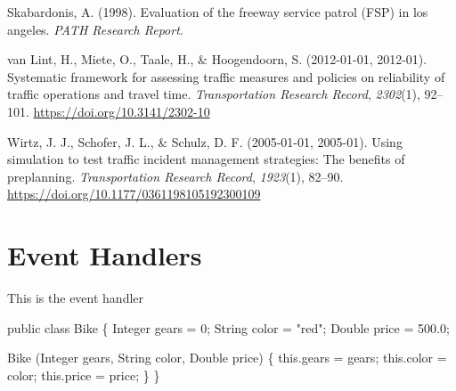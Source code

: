 \documentclass[fancy, oneside, mastersfancy, ms]{byuthesis}
\newenvironment{Shaded}{\begin{snugshade}}{\end{snugshade}}
\newcommand{\BuiltInTok}[1]{\textcolor[rgb]{0.00,0.23,0.31}{#1}}
\newcommand{\DecValTok}[1]{\textcolor[rgb]{0.68,0.00,0.00}{#1}}
\newcommand{\FloatTok}[1]{\textcolor[rgb]{0.68,0.00,0.00}{#1}}
\newcommand{\FunctionTok}[1]{\textcolor[rgb]{0.28,0.35,0.67}{#1}}
\newcommand{\KeywordTok}[1]{\textcolor[rgb]{0.00,0.23,0.31}{#1}}
\newcommand{\NormalTok}[1]{\textcolor[rgb]{0.00,0.23,0.31}{#1}}
\newcommand{\OperatorTok}[1]{\textcolor[rgb]{0.37,0.37,0.37}{#1}}
\newcommand{\StringTok}[1]{\textcolor[rgb]{0.13,0.47,0.30}{#1}}
\newlength{\cslhangindent}
\newlength{\cslentryspacingunit} %
\newenvironment{CSLReferences}[2] %
 {%
  \setlength{\parindent}{0pt}
  \ifodd #1
  \let\oldpar\par
  \def\par{\hangindent=\cslhangindent\oldpar}
  \fi
  \setlength{\parskip}{#2\cslentryspacingunit}
 }%
 {}
\begin{document}
\begin{CSLReferences}{1}{0}
\leavevmode{}%
Skabardonis, A. (1998). Evaluation of the freeway service patrol ({FSP})
in los angeles. \emph{PATH Research Report}.

\leavevmode{}%
van Lint, H., Miete, O., Taale, H., \& Hoogendoorn, S. (2012-01-01,
2012-01). Systematic framework for assessing traffic measures and
policies on reliability of traffic operations and travel time.
\emph{Transportation Research Record}, \emph{2302}(1), 92--101.
\url{https://doi.org/10.3141/2302-10}

\leavevmode{}%
Wirtz, J. J., Schofer, J. L., \& Schulz, D. F. (2005-01-01, 2005-01).
Using simulation to test traffic incident management strategies: {The}
benefits of preplanning. \emph{Transportation Research Record},
\emph{1923}(1), 82--90.
\url{https://doi.org/10.1177/0361198105192300109}

\end{CSLReferences}

\cleardoublepage
{}
{}
\appendix

\hypertarget{event-handlers}{%
\chapter{Event Handlers}\label{event-handlers}}

This is the event handler

\begin{Shaded}
\begin{Highlighting}[]
\KeywordTok{public} \KeywordTok{class}\NormalTok{ Bike }\OperatorTok{\{}
    \BuiltInTok{Integer}\NormalTok{ gears }\OperatorTok{=} \DecValTok{0}\OperatorTok{;}
    \BuiltInTok{String}\NormalTok{ color }\OperatorTok{=} \StringTok{"red"}\OperatorTok{;}
    \BuiltInTok{Double}\NormalTok{ price }\OperatorTok{=} \FloatTok{500.0}\OperatorTok{;}

    \FunctionTok{Bike} \OperatorTok{(}\BuiltInTok{Integer}\NormalTok{ gears}\OperatorTok{,} \BuiltInTok{String}\NormalTok{ color}\OperatorTok{,} \BuiltInTok{Double}\NormalTok{ price}\OperatorTok{)} \OperatorTok{\{}
        \KeywordTok{this}\OperatorTok{.}\FunctionTok{gears} \OperatorTok{=}\NormalTok{ gears}\OperatorTok{;}
        \KeywordTok{this}\OperatorTok{.}\FunctionTok{color} \OperatorTok{=}\NormalTok{ color}\OperatorTok{;}
        \KeywordTok{this}\OperatorTok{.}\FunctionTok{price} \OperatorTok{=}\NormalTok{ price}\OperatorTok{;}
    \OperatorTok{\}}
\OperatorTok{\}}
\end{Highlighting}
\end{Shaded}
\end{document}
